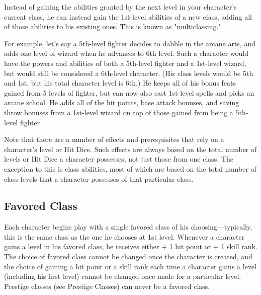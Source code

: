				
Instead of gaining the abilities granted by the next level in your character's current class, he can instead gain the 1st-level abilities of a new class, adding all of those abilities to his existing ones. This is known as "multiclassing."
				
For example, let's say a 5th-level fighter decides to dabble in the arcane arts, and adds one level of wizard when he advances to 6th level. Such a character would have the powers and abilities of both a 5th-level fighter and a 1st-level wizard, but would still be considered a 6th-level character. (His class levels would be 5th and 1st, but his total character level is 6th.) He keeps all of his bonus feats gained from 5 levels of fighter, but can now also cast 1st-level spells and picks an arcane school. He adds all of the hit points, base attack bonuses, and saving throw bonuses from a 1st-level wizard on top of those gained from being a 5th-level fighter.
				
Note that there are a number of effects and prerequisites that rely on a character's level or Hit Dice. Such effects are always based on the total number of levels or Hit Dice a character possesses, not just those from one class. The exception to this is class abilities, most of which are based on the total number of class levels that a character possesses of that particular class.
				
\subsection{Favored Class}

				
Each character begins play with a single favored class of his choosing---typically, this is the same class as the one he chooses at 1st level. Whenever a character gains a level in his favored class, he receives either + 1 hit point or + 1 skill rank. The choice of favored class cannot be changed once the character is created, and the choice of gaining a hit point or a skill rank each time a character gains a level (including his first level) cannot be changed once made for a particular level. Prestige classes (see Prestige Classes) can never be a favored class. 
        	
        	













